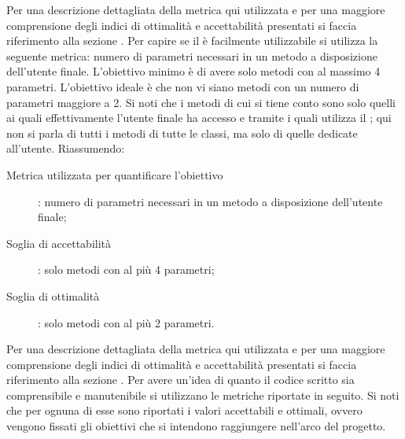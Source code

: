 					Per una descrizione dettagliata della metrica qui utilizzata e per una maggiore comprensione degli indici di ottimalità e accettabilità presentati si faccia riferimento alla sezione .
					Per capire se il  è facilmente utilizzabile si utilizza la seguente metrica: numero di parametri necessari in un metodo a disposizione dell'utente finale. L'obiettivo minimo è di avere solo metodi con al massimo 4 parametri. L'obiettivo ideale è che non vi siano metodi con un numero di parametri maggiore a 2. Si noti che i metodi di cui si tiene conto sono solo quelli ai quali effettivamente l'utente finale ha accesso e tramite i quali utilizza il ; qui non si parla di tutti i metodi di tutte le classi, ma solo di quelle dedicate all'utente. Riassumendo:
					\begin{description}
						\item[Metrica utilizzata per quantificare l'obiettivo]: numero di parametri necessari in un metodo a disposizione dell'utente finale;
						\item[Soglia di accettabilità]: solo metodi con al più 4 parametri;
						\item[Soglia di ottimalità]: solo metodi con al più 2 parametri.
					\end{description}
					Per una descrizione dettagliata della metrica qui utilizzata e per una maggiore comprensione degli indici di ottimalità e accettabilità presentati si faccia riferimento alla sezione .
					Per avere un'idea di quanto il codice scritto sia comprensibile e manutenibile si utilizzano le metriche riportate in seguito. Si noti che per ognuna di esse sono riportati i valori accettabili e ottimali, ovvero vengono fissati gli obiettivi che si intendono raggiungere nell'arco del progetto.
